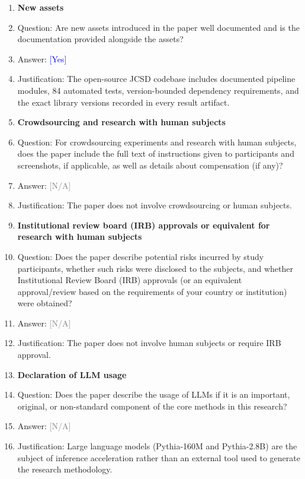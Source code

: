 \documentclass[10pt]{article}
\newcommand{\answerYes}[1][]{\textcolor{blue}{[Yes]} #1}
\newcommand{\answerNA}[1][]{\textcolor{gray}{[N/A]} #1}
\begin{document}
\begin{enumerate}
\item {\bf New assets}
    \item[] Question: Are new assets introduced in the paper well documented and is the documentation provided alongside the assets?
    \item[] Answer: \answerYes{}
    \item[] Justification: The open-source JCSD codebase includes documented pipeline modules, 84 automated tests, version-bounded dependency requirements, and the exact library versions recorded in every result artifact.

\item {\bf Crowdsourcing and research with human subjects}
    \item[] Question: For crowdsourcing experiments and research with human subjects, does the paper include the full text of instructions given to participants and screenshots, if applicable, as well as details about compensation (if any)?
    \item[] Answer: \answerNA{}
    \item[] Justification: The paper does not involve crowdsourcing or human subjects.

\item {\bf Institutional review board (IRB) approvals or equivalent for research with human subjects}
    \item[] Question: Does the paper describe potential risks incurred by study participants, whether such risks were disclosed to the subjects, and whether Institutional Review Board (IRB) approvals (or an equivalent approval/review based on the requirements of your country or institution) were obtained?
    \item[] Answer: \answerNA{}
    \item[] Justification: The paper does not involve human subjects or require IRB approval.

\item {\bf Declaration of LLM usage}
    \item[] Question: Does the paper describe the usage of LLMs if it is an important, original, or non-standard component of the core methods in this research?
    \item[] Answer: \answerNA{}
    \item[] Justification: Large language models (Pythia-160M and Pythia-2.8B) are the subject of inference acceleration rather than an external tool used to generate the research methodology.

\end{enumerate}
\end{document}
